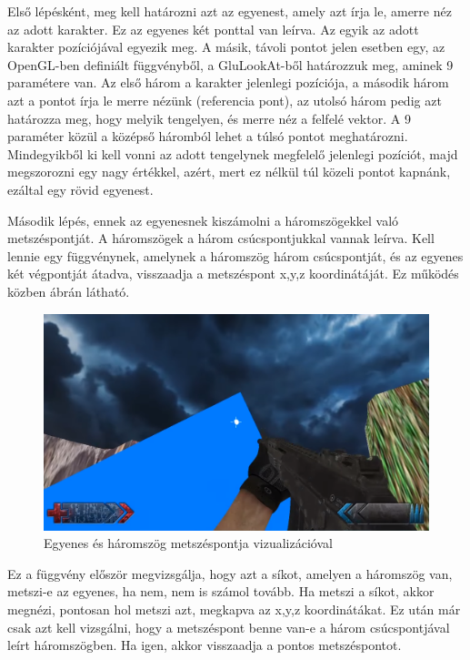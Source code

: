 Első lépésként, meg kell határozni azt az egyenest, amely azt írja le, amerre néz az adott karakter. Ez az egyenes két ponttal van leírva. Az egyik az adott karakter pozíciójával egyezik meg. A másik, távoli pontot jelen esetben egy, az OpenGL-ben definiált függvényből, a GluLookAt-ből határozzuk meg, aminek 9 paramétere van. Az első három a karakter jelenlegi pozíciója, a második három azt a pontot írja le merre nézünk (referencia pont), az utolsó három pedig azt határozza meg, hogy melyik tengelyen, és merre néz a felfelé vektor. A 9 paraméter közül a középső háromból lehet a túlsó pontot  meghatározni. Mindegyikből ki kell vonni az adott tengelynek megfelelő jelenlegi pozíciót, majd megszorozni egy nagy értékkel, azért, mert ez nélkül túl közeli pontot kapnánk, ezáltal egy rövid egyenest.

Második lépés, ennek az egyenesnek kiszámolni a háromszögekkel való metszéspontját. A háromszögek a három csúcspontjukkal vannak leírva. Kell lennie egy függvénynek, amelynek a háromszög három csúcspontját, és az egyenes két végpontját átadva, visszaadja a metszéspont x,y,z koordinátáját. Ez működés közben  ábrán látható.

\begin{figure}[h]
\centering
\includegraphics[scale=0.46]{kepek/one_triangle.png}
\caption{Egyenes és háromszög metszéspontja vizualizációval}
\label{fig:triangle}
\end{figure}

Ez a függvény először megvizsgálja, hogy azt a síkot, amelyen a háromszög van, metszi-e az egyenes, ha nem, nem is számol tovább. Ha metszi a síkot, akkor megnézi, pontosan hol metszi azt, megkapva az x,y,z koordinátákat. Ez után már csak azt kell vizsgálni, hogy a metszéspont benne van-e a három csúcspontjával leírt háromszögben. Ha igen, akkor visszaadja a pontos metszéspontot.

